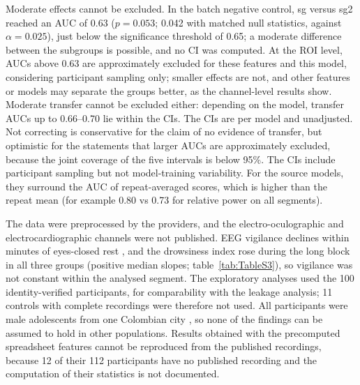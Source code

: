 Moderate effects cannot be excluded. In the batch negative control, sg versus sg2 reached an AUC of 0.63 ($p = 0.053$; 0.042 with matched null statistics, against $\alpha = 0.025$), just below the significance threshold of 0.65; a moderate difference between the subgroups is possible, and no CI was computed. At the ROI level, AUCs above 0.63 are approximately excluded for these features and this model, considering participant sampling only; smaller effects are not, and other features or models may separate the groups better, as the channel-level results show. Moderate transfer cannot be excluded either: depending on the model, transfer AUCs up to 0.66--0.70 lie within the CIs. The CIs are per model and unadjusted. Not correcting is conservative for the claim of no evidence of transfer, but optimistic for the statements that larger AUCs are approximately excluded, because the joint coverage of the five intervals is below 95\%. The CIs include participant sampling but not model-training variability. For the source models, they surround the AUC of repeat-averaged scores, which is higher than the repeat mean (for example 0.80 vs 0.73 for relative power on all segments).

The data were preprocessed by the providers, and the electro-oculographic and electrocardiographic channels were not published. EEG vigilance declines within minutes of eyes-closed rest \cite{Olbrich2009}, and the drowsiness index rose during the long block in all three groups (positive median slopes; table~\ref{tab:TableS3}), so vigilance was not constant within the analysed segment. The exploratory analyses used the 100 identity-verified participants, for comparability with the leakage analysis; 11 controls with complete recordings were therefore not used. All participants were male adolescents from one Colombian city \cite{RodriguezAlvarez2023}, so none of the findings can be assumed to hold in other populations.
Results obtained with the precomputed spreadsheet features cannot be reproduced from the published recordings, because 12 of their 112 participants have no published recording and the computation of their statistics is not documented.

